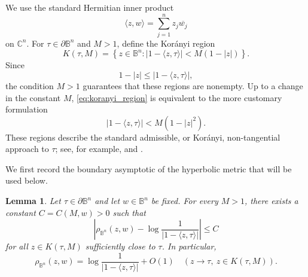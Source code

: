 \documentclass[12pt]{amsart}
\numberwithin{equation}{section}
\theoremstyle{plain}
\newtheorem{lemma}[equation]{Lemma}
\theoremstyle{definition}
\begin{document}
We use the standard Hermitian inner product
\begin{equation*}
\langle z,w\rangle
=
\sum_{j=1}^n z_j\overline{w_j}
\end{equation*}
on $\mathbb C^n$. For $\tau\in\partial\mathbb B^n$ and $M>1$, define the
Kor\'anyi region
\begin{equation}
\label{eq:koranyi_region}
K(\tau,M)
=
\left\{
z\in\mathbb B^n:
|1-\langle z,\tau\rangle|
<
M(1-|z|)
\right\}.
\end{equation}
Since
\begin{equation*}
1-|z|
\le
|1-\langle z,\tau\rangle|,
\end{equation*}
the condition $M>1$ guarantees that these regions are nonempty. Up to a
change in the constant $M$, \eqref{eq:koranyi_region} is equivalent to
the more customary formulation
\begin{equation*}
|1-\langle z,\tau\rangle|
<
M(1-|z|^2).
\end{equation*}
These regions describe the standard admissible, or Kor\'anyi,
non-tangential approach to $\tau$; see, for example,
\cite{Ko} and \cite[p.~170]{Rudin}.

We first record the boundary asymptotic of the hyperbolic metric that
will be used below.

\begin{lemma}
\label{lem:ball_asymp}
Let $\tau\in\partial\mathbb B^n$ and let $w\in\mathbb B^n$ be fixed.
For every $M>1$, there exists a constant
$C=C(M,w)>0$ such that
\begin{equation}
\label{eq:ball_asymp}
\left|
\rho_{\mathbb B^n}(z,w)
-
\log\frac{1}{|1-\langle z,\tau\rangle|}
\right|
\le C
\end{equation}
for all $z\in K(\tau,M)$ sufficiently close to $\tau$. In particular,
\begin{equation}
\label{eq:ball_asymp_o1}
\rho_{\mathbb B^n}(z,w)
=
\log\frac{1}{|1-\langle z,\tau\rangle|}
+
O(1)
\quad
(z\to\tau,\ z\in K(\tau,M)).
\end{equation}
\end{lemma}
\end{document}
